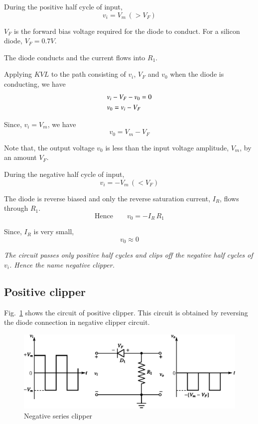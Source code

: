 During the positive half cycle of input,
$$
v_{i}=V_{m}\,(>V_{F})
$$

$V_{F}$ is the forward bias voltage required for the diode to conduct. For a silicon diode, $V_{F}=0.7V$.

The diode conducts and the current flows into $R_{1}$.

Applying $KVL$ to the path consisting of $v_{i}$, $V_{F}$ and $v_{0}$ when the diode is conducting, we have
\begin{align}
& v_{i}-V_{F}-v_{0}=0\notag\\
& v_{0}=v_{i}-V_{F}\label{eq2.88}
\end{align}

Since, $v_{i}=V_{m}$, we have
\begin{equation}
v_{0}=V_{m}-V_{F}\label{eq2.89}
\end{equation}

Note that, the output voltage $v_{0}$ is less than the input voltage amplitude, $V_{m}$, by an amount $V_{F}$.

During the negative half cycle of input,
$$
v_{i}=-V_{m}\,(<V_{F})
$$

The diode is reverse biased and only the reverse saturation current, $I_{R}$, flows through $R_{1}$.
\begin{equation}
\text{Hence}\qquad v_{0}=-I_{R}\,R_{1}\label{eq2.90}
\end{equation}

Since, $I_{R}$ is very small,
\begin{equation}
v_{0}\approx 0\label{eq2.91}
\end{equation}


{\em The circuit passes only positive half cycles and clips off the negative half cycles of $v_{i}$. Hence the name negative clipper.}

\subsection{Positive clipper}\label{sec2.30.2}

Fig.~\ref{fig2.26} shows the circuit of positive clipper. This circuit is obtained by reversing the diode connection in negative clipper circuit.
\begin{figure}[H]
\centering
\includegraphics{chap2/fig2.26.eps}
\caption{Negative series clipper}\label{fig2.26}
\end{figure}

